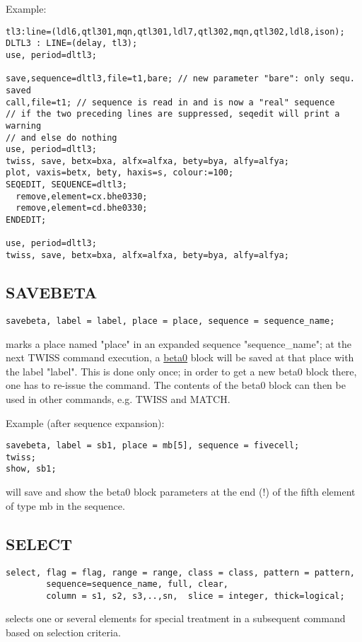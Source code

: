 Example:  
\begin{verbatim}
tl3:line=(ldl6,qtl301,mqn,qtl301,ldl7,qtl302,mqn,qtl302,ldl8,ison);
DLTL3 : LINE=(delay, tl3);
use, period=dltl3;

save,sequence=dltl3,file=t1,bare; // new parameter "bare": only sequ. saved
call,file=t1; // sequence is read in and is now a "real" sequence
// if the two preceding lines are suppressed, seqedit will print a warning
// and else do nothing
use, period=dltl3;
twiss, save, betx=bxa, alfx=alfxa, bety=bya, alfy=alfya;
plot, vaxis=betx, bety, haxis=s, colour:=100;
SEQEDIT, SEQUENCE=dltl3;
  remove,element=cx.bhe0330;
  remove,element=cd.bhe0330;
ENDEDIT;

use, period=dltl3;
twiss, save, betx=bxa, alfx=alfxa, bety=bya, alfy=alfya;
\end{verbatim}


\subsection{SAVEBETA}
\label{subsec:general_savebeta}
\begin{verbatim}
savebeta, label = label, place = place, sequence = sequence_name;
\end{verbatim} 
marks a place named "place" in an expanded sequence "sequence\_name"; 
at the next TWISS command execution, a
\href{../twiss/twiss.html#beta0}{beta0} 
block will be saved at that place with the label "label". This is done
only once; in order to get a new beta0 block there, one has to re-issue
the command. The contents of the beta0 block can then be used in other
commands, e.g. TWISS and MATCH.  

Example (after sequence expansion): 
\begin{verbatim}
savebeta, label = sb1, place = mb[5], sequence = fivecell;
twiss;
show, sb1;
\end{verbatim} 
will save and show the beta0 block parameters at the end (!) of the
fifth element of type mb in the sequence.  


\subsection{SELECT} 
\begin{verbatim}
select, flag = flag, range = range, class = class, pattern = pattern,
        sequence=sequence_name, full, clear,
        column = s1, s2, s3,..,sn,  slice = integer, thick=logical;
\end{verbatim} 
selects one or several elements for special treatment in a subsequent
command based on selection criteria.


